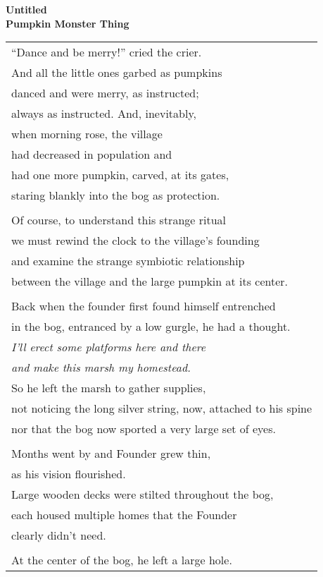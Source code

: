 \documentclass{article}
\begin{document}
\newcommand{\h}{\hspace*{4ex}}

\begin{center}
\textbf{Untitled} \\ %
{\small\textbf{Pumpkin Monster Thing}} \\
\vspace*{2ex}
\begin{tabular}{l}
``Dance and be merry!'' cried the crier. \\
And all the little ones garbed as pumpkins \\
danced and were merry, as instructed; \\
always as instructed. And, inevitably, \\
when morning rose, the village \\
had decreased in population and \\
had one more pumpkin, carved, at its gates, \\
staring blankly into the bog as protection. \\
\\
Of course, to understand this strange ritual \\
we must rewind the clock to the village's founding \\
and examine the strange symbiotic relationship \\
between the village and the large pumpkin at its center. \\
\\
Back when the founder first found himself entrenched \\
in the bog, entranced by a low gurgle, he had a thought. \\
\h \textit{I'll erect some platforms here and there} \\
\h \textit{and make this marsh my homestead.} \\
So he left the marsh to gather supplies, \\
not noticing the long silver string, now, attached to his spine \\
nor that the bog now sported a very large set of eyes. \\
\\
Months went by and Founder grew thin, \\
as his vision flourished. \\
Large wooden decks were stilted throughout the bog, \\
each housed multiple homes that the Founder \\
clearly didn't need. \\
\\
At the center of the bog, he left a large hole. \\

\end{tabular}
\end{center}
\end{document}
